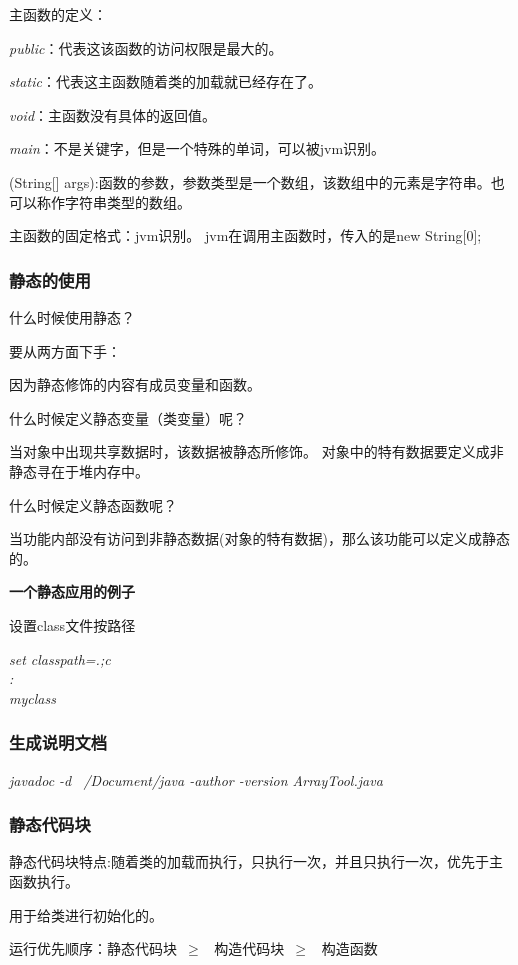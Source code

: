 \documentclass[UTF8]{ctexart}
\begin{document}
主函数的定义：

\textit{public}：代表这该函数的访问权限是最大的。

\textit{static}：代表这主函数随着类的加载就已经存在了。

\textit{void}：主函数没有具体的返回值。

\textit{main}：不是关键字，但是一个特殊的单词，可以被jvm识别。

(String[] args):函数的参数，参数类型是一个数组，该数组中的元素是字符串。也可以称作字符串类型的数组。

主函数的固定格式：jvm识别。
jvm在调用主函数时，传入的是new String[0];

\subsubsection{静态的使用}
什么时候使用静态？

要从两方面下手：

因为静态修饰的内容有成员变量和函数。

什么时候定义静态变量（类变量）呢？

当对象中出现共享数据时，该数据被静态所修饰。
对象中的特有数据要定义成非静态寻在于堆内存中。

什么时候定义静态函数呢？

当功能内部没有访问到非静态数据(对象的特有数据)，那么该功能可以定义成静态的。

\textbf{一个静态应用的例子}



设置class文件按路径

\textit{set classpath=.;c\\:\\myclass}
\subsubsection{生成说明文档}

\textit{javadoc -d ~/Document/java -author -version ArrayTool.java}
\subsubsection{静态代码块}

静态代码块特点:随着类的加载而执行，只执行一次，并且只执行一次，优先于主函数执行。

用于给类进行初始化的。

运行优先顺序：静态代码块~$\geq$~ 构造代码块~$\geq$~ 构造函数
 
\end{document}
